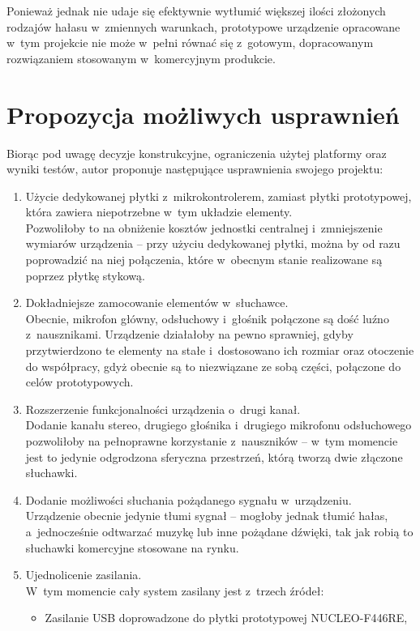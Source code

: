 Ponieważ jednak nie udaje się efektywnie wytłumić większej ilości złożonych rodzajów hałasu w~zmiennych warunkach, prototypowe urządzenie opracowane w~tym projekcie nie może w~pełni równać się z~gotowym, dopracowanym rozwiązaniem stosowanym w~komercyjnym produkcie. 
\section{Propozycja możliwych usprawnień}
Biorąc pod uwagę decyzje konstrukcyjne, ograniczenia użytej platformy oraz wyniki testów, autor proponuje następujące usprawnienia swojego projektu:
\begin{enumerate}
	\item Użycie dedykowanej płytki z~mikrokontrolerem, zamiast płytki prototypowej, która zawiera niepotrzebne w~tym układzie elementy.\\
	Pozwoliłoby to na obniżenie kosztów jednostki centralnej i~zmniejszenie wymiarów urządzenia -- przy użyciu dedykowanej płytki, można by od razu poprowadzić na niej połączenia, które w~obecnym stanie realizowane są poprzez płytkę stykową.
	\item Dokładniejsze zamocowanie elementów w~słuchawce.\\
	Obecnie, mikrofon główny, odsłuchowy i~głośnik połączone są dość luźno z~nausznikami. Urządzenie działałoby na pewno sprawniej, gdyby przytwierdzono te elementy na stałe i~dostosowano ich rozmiar oraz otoczenie do współpracy, gdyż obecnie są to niezwiązane ze sobą części, połączone do celów prototypowych.
	\item Rozszerzenie funkcjonalności urządzenia o~drugi kanał.\\
	Dodanie kanału stereo, drugiego głośnika i~drugiego mikrofonu odsłuchowego pozwoliłoby na pełnoprawne korzystanie z~nauszników -- w~tym momencie jest to jedynie odgrodzona sferyczna przestrzeń, którą tworzą dwie złączone słuchawki.
	\item Dodanie możliwości słuchania pożądanego sygnału w~urządzeniu.\\
	Urządzenie obecnie jedynie tłumi sygnał -- mogłoby jednak tłumić hałas, a~jednocześnie odtwarzać muzykę lub inne pożądane dźwięki, tak jak robią to słuchawki komercyjne stosowane na rynku.
	\item Ujednolicenie zasilania.\\
	W~tym momencie cały system zasilany jest z~trzech źródeł:
	\begin{itemize}
	\item Zasilanie USB doprowadzone do płytki prototypowej NUCLEO-F446RE,

\end{itemize}
\end{enumerate}
